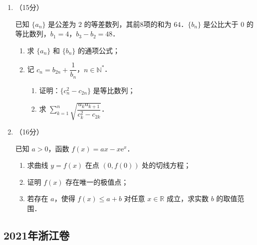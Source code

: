 \begin{description}
\begin{enumerate}[leftmargin=5pt]
        \item （15分）

        已知 $\{a_n\}$ 是公差为 $2$ 的等差数列，其前8项的和为 $64$．$\{b_n\}$ 是公比大于 $0$ 的等比数列，$b_1=4$，$b_3-b_2=48$．

        \begin{enumerate}[label=(\arabic*)]
            \item 求 $\{a_n\}$ 和 $\{b_n\}$ 的通项公式；
            \item 记 $c_n=b_{2n}+\dfrac{1}{b_n}$，$n\in\mathbb{N}^*$．
            \begin{enumerate}[label=(\roman*)]
                \item 证明：$\{c_n^2-c_{2n}\}$ 是等比数列；
                \item 求 $\displaystyle\sum_{k=1}^{n}\sqrt{\dfrac{a_k a_{k+1}}{c_k^2-c_{2k}}}$．
            \end{enumerate}
        \end{enumerate}

        \item （16分）

        已知 $a>0$，函数 $f(x)=ax-x\mathrm{e}^x$．

        \begin{enumerate}[label=(\arabic*)]
            \item 求曲线 $y=f(x)$ 在点 $(0,f(0))$ 处的切线方程；
            \item 证明 $f(x)$ 存在唯一的极值点；
            \item 若存在 $a$，使得 $f(x)\leqslant a+b$ 对任意 $x\in\mathbb{R}$ 成立，求实数 $b$ 的取值范围．
        \end{enumerate}
    \end{enumerate}
\end{description}
\clearpage



\subsection{2021年浙江卷}\label{gk:2021年浙江卷}

